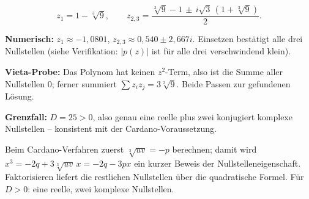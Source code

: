 \begin{ergebnis}
\begin{equation*}
  z_1=1-\sqrt[3]{9},\qquad
  z_{2,3}=\frac{\sqrt[3]{9}-1\,\pm\,i\sqrt3\,(1+\sqrt[3]{9})}{2}.
\end{equation*}
\end{ergebnis}

\begin{kontrolle}
\textbf{Numerisch:} $z_1\approx-1{,}0801$, $z_{2,3}\approx0{,}540\pm
2{,}667i$. Einsetzen bestätigt alle drei Nullstellen (siehe Verifikation:
$|p(z)|$ ist für alle drei verschwindend klein). \checkmark

\textbf{Vieta-Probe:} Das Polynom hat keinen $z^2$-Term, also ist die
Summe aller Nullstellen $0$; ferner summiert $\sum z_iz_j=3\sqrt[3]{9}$.
Beide Passen zur gefundenen Lösung. \checkmark

\textbf{Grenzfall:} $D=25>0$, also genau eine reelle plus zwei konjugiert
komplexe Nullstellen -- konsistent mit der Cardano-Voraussetzung.
\checkmark
\end{kontrolle}

\begin{merksatz}
Beim Cardano-Verfahren zuerst $\sqrt[3]{uv}=-p$ berechnen; damit wird
$x^3=-2q+3\sqrt[3]{uv}\,x=-2q-3px$ ein kurzer Beweis der
Nullstelleneigenschaft. Faktorisieren liefert die restlichen Nullstellen
über die quadratische Formel. Für $D>0$: eine reelle, zwei komplexe
Nullstellen.
\end{merksatz}
